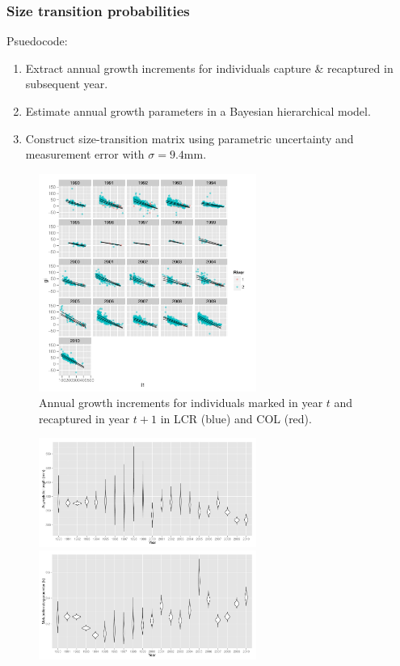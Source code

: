\documentclass{beamer}
\begin{document}
\begin{frame}
	\frametitle{Size transition probabilities}
	{
		\begin{block}{Psuedocode:}
			\begin{enumerate}
				\item Extract annual growth increments for individuals capture \& recaptured in subsequent year.
				\item Estimate annual growth parameters in a Bayesian hierarchical model.
				\item Construct size-transition matrix using parametric uncertainty and measurement error with $\sigma=9.4$mm.
			\end{enumerate}
		\end{block}
	}
	
	{
		 \begin{figure}[htbp]
		 	\centering
		 		\includegraphics[height=2.8in]{../../FIGS/LSMR/fig:AnnualGrowthIncrements.pdf}
			\caption{Annual growth increments for individuals marked in year $t$ and recaptured in year $t+1$ in LCR (blue) and COL (red).}
		 	\label{fig:FIGS_LSMR_fig:AnnualGrowthIncrements}
		 \end{figure}
	}
	{
		\begin{figure}[htbp]
			\centering
				\includegraphics[width=2.8in]{../../FIGS/LSMR/fig:LinfPosteriors.pdf}\\
				\includegraphics[width=2.8in]{../../FIGS/LSMR/fig:kPosteriors.pdf}

\end{figure}}
\end{frame}
\end{document}
